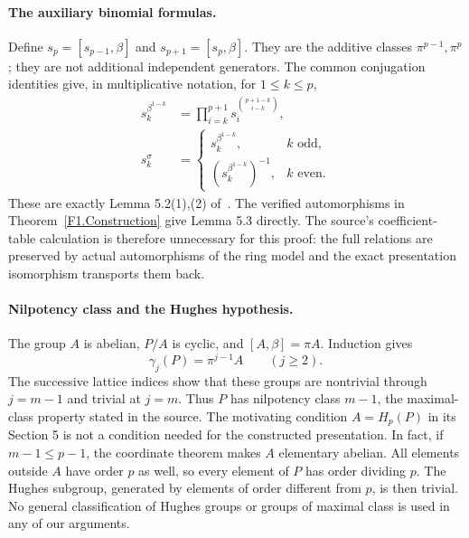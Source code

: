\paragraph{The auxiliary binomial formulas.}
Define $s_p=[s_{p-1},\beta]$ and $s_{p+1}=[s_p,\beta]$.
They are the additive classes $\pi^{p-1},\pi^p$; they are not
additional independent generators. The common conjugation identities
give, in multiplicative notation, for $1\leq k\leq p$,
\begin{align*}
 s_k^{\beta^{1-k}}&=\prod_{i=k}^{p+1}
           s_i^{\binom{p+1-k}{i-k}},\\
 s_k^\sigma&=
 \begin{cases}
 s_k^{\beta^{1-k}},&k\text{ odd},\\
 (s_k^{\beta^{1-k}})^{-1},&k\text{ even}.
 \end{cases}
\end{align*}
These are exactly Lemma 5.2(1),(2) of~\cite{HFLQ}.
The verified automorphisms in Theorem~\ref{F1.Construction} give
Lemma 5.3 directly. The source's coefficient-table calculation is
therefore unnecessary for this proof: the full relations are
preserved by actual automorphisms of the ring model and the exact
presentation isomorphism transports them back.

\paragraph{Nilpotency class and the Hughes hypothesis.}
The group $A$ is abelian, $P/A$ is cyclic, and
$[A,\beta]=\pi A$. Induction gives
\[
 \gamma_j(P)=\pi^{j-1}A\qquad(j\geq2).
\]
The successive lattice indices show that these groups are nontrivial
through $j=m-1$ and trivial at $j=m$. Thus $P$ has nilpotency
class $m-1$, the maximal-class property stated in the source.
The motivating condition $A=H_p(P)$ in its Section 5 is not a
condition needed for the constructed presentation. In fact, if
$m-1\leq p-1$, the coordinate theorem makes $A$ elementary
abelian. All elements outside $A$ have order $p$ as well, so every
element of $P$ has order dividing $p$. The Hughes subgroup, generated
by elements of order different from $p$, is then trivial. No general
classification of Hughes groups or groups of maximal class is used
in any of our arguments.
